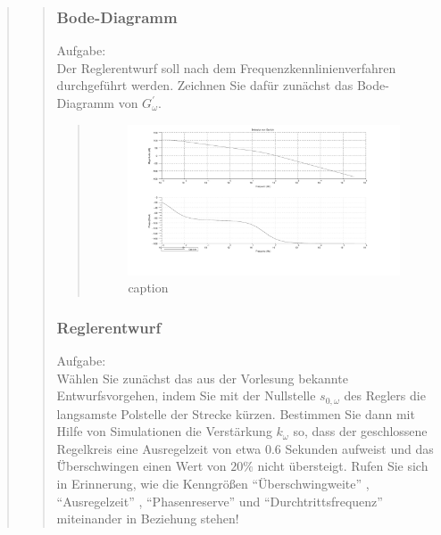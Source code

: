 \begin{quote}
\begin{quote}
		\subsubsection{Bode-Diagramm}
        Aufgabe:\\
        Der Reglerentwurf soll nach dem Frequenzkennlinienverfahren durchgeführt werden. Zeichnen Sie dafür zunächst
        das Bode-Diagramm von $G_\omega^{'}$.\\   
        \begin{quote}
            \begin{figure}[H]
            \centering
                \includegraphics[scale=0.5, trim = 0cm 0cm 0cm 0cm, clip]{./Bilder/BodevonGstrich}
                    \caption{caption}
                    \label{fig:BodevonGstrich}
            \end{figure}
       
        \end{quote}

        \subsubsection{Reglerentwurf}
        Aufgabe:\\        
        Wählen Sie zunächst das aus der Vorlesung bekannte Entwurfsvorgehen, indem Sie mit der Nullstelle $s_{0,\omega}$
        des Reglers die langsamste Polstelle der Strecke kürzen. Bestimmen Sie dann mit Hilfe von Simulationen die
        Verstärkung $k_\omega$ so, dass der geschlossene Regelkreis eine Ausregelzeit von etwa $0.6$ Sekunden aufweist
        und das Ü̈berschwingen einen Wert von $20\%$ nicht übersteigt. Rufen Sie sich in Erinnerung, wie die
        Kenngrößen ``Überschwingweite'' , ``Ausregelzeit'' , ``Phasenreserve'' und ``Durchtrittsfrequenz''
        miteinander in Beziehung stehen!
        \begin{quote} 


\end{quote}
\end{quote}
\end{quote}
